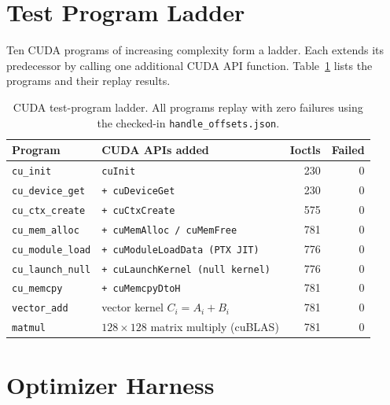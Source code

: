 \documentclass[11pt,a4paper]{article}
\begin{document}
\section{Test Program Ladder}
\label{sec:ladder}

Ten CUDA programs of increasing complexity form a ladder.
Each extends its predecessor by calling one additional CUDA API function.
Table~\ref{tab:ladder} lists the programs and their replay results.

\begin{table}[H]
\centering
\caption{CUDA test-program ladder. All programs replay with zero failures
         using the checked-in \texttt{handle\_offsets.json}.}
\label{tab:ladder}
\begin{tabular}{llrr}
\toprule
\textbf{Program} & \textbf{CUDA APIs added} & \textbf{Ioctls} & \textbf{Failed} \\
\midrule
\texttt{cu\_init}        & \texttt{cuInit}                                & 230 & 0 \\
\texttt{cu\_device\_get} & \texttt{+ cuDeviceGet}                         & 230 & 0 \\
\texttt{cu\_ctx\_create} & \texttt{+ cuCtxCreate}                         & 575 & 0 \\
\texttt{cu\_mem\_alloc}  & \texttt{+ cuMemAlloc / cuMemFree}              & 781 & 0 \\
\texttt{cu\_module\_load}& \texttt{+ cuModuleLoadData (PTX JIT)}          & 776 & 0 \\
\texttt{cu\_launch\_null}& \texttt{+ cuLaunchKernel (null kernel)}        & 776 & 0 \\
\texttt{cu\_memcpy}      & \texttt{+ cuMemcpyDtoH}                        & 781 & 0 \\
\texttt{vector\_add}     & vector kernel $C_i = A_i + B_i$               & 781 & 0 \\
\texttt{matmul}          & $128\times128$ matrix multiply (cuBLAS)        & 781 & 0 \\
\bottomrule
\end{tabular}
\end{table}

\section{Optimizer Harness}
\label{sec:optimizer}
\end{document}
